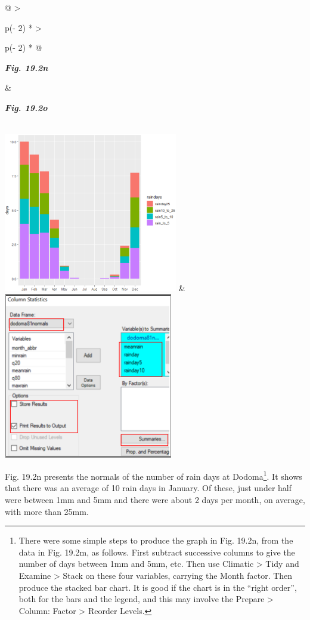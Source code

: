 \documentclass[
  letterpaper,
  DIV=11,
  numbers=noendperiod]{scrreprt}
\begin{document}
\begin{longtable}[]{@{}
  >{\raggedright\arraybackslash}p{(\columnwidth - 2\tabcolsep) * }
  >{\raggedright\arraybackslash}p{(\columnwidth - 2\tabcolsep) * }@{}}
\toprule\noalign{}
\begin{minipage}[b]{\linewidth}\raggedright
\textbf{\emph{Fig. 19.2n}}
\end{minipage} & \begin{minipage}[b]{\linewidth}\raggedright
\textbf{\emph{Fig. 19.2o}}
\end{minipage} \\
\midrule\noalign{}
\endhead
\bottomrule\noalign{}
\endlastfoot
\includegraphics[width=2.98869in,height=2.75327in]{figures/Fig19.2n.png}
&
\includegraphics[width=2.91184in,height=2.8491in]{figures/Fig19.2o.png} \\
\end{longtable}

Fig. 19.2n presents the normals of the number of rain days at
Dodoma\footnote{There were some simple steps to produce the graph in
  Fig. 19.2n, from the data in Fig. 19.2m, as follows. First subtract
  successive columns to give the number of days between 1mm and 5mm,
  etc. Then use Climatic \textgreater{} Tidy and Examine \textgreater{}
  Stack on these four variables, carrying the Month factor. Then produce
  the stacked bar chart. It is good if the chart is in the ``right
  order'', both for the bars and the legend, and this may involve the
  Prepare \textgreater{} Column: Factor \textgreater{} Reorder Levels.}.
It shows that there was an average of 10 rain days in January. Of these,
just under half were between 1mm and 5mm and there were about 2 days per
month, on average, with more than 25mm.
\end{document}
